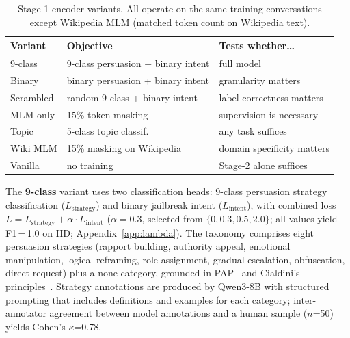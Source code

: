 \begin{table}[t]
\centering
\small
\caption{Stage-1 encoder variants. All operate on the same training conversations except Wikipedia MLM (matched token count on Wikipedia text).}
\label{tab:variants}
\begin{tabular}{@{}p{1.6cm}p{2.2cm}p{2.8cm}@{}}
\toprule
\textbf{Variant} & \textbf{Objective} & \textbf{Tests whether\ldots} \\
\midrule
9-class & 9-class persuasion + binary intent & full model \\
Binary & binary persuasion + binary intent & granularity matters \\
Scrambled & random 9-class + binary intent & label correctness matters \\
MLM-only & 15\% token masking & supervision is necessary \\
Topic & 5-class topic classif. & any task suffices \\
Wiki MLM & 15\% masking on Wikipedia & domain specificity matters \\
Vanilla & no training & Stage-2 alone suffices \\
\bottomrule
\end{tabular}
\end{table}

The \textbf{9-class} variant uses two classification heads: 9-class persuasion strategy classification ($L_{\text{strategy}}$) and binary jailbreak intent ($L_{\text{intent}}$), with combined loss $L = L_{\text{strategy}} + \alpha \cdot L_{\text{intent}}$ ($\alpha = 0.3$, selected from $\{0, 0.3, 0.5, 2.0\}$; all values yield F1\,=\,1.0 on IID; Appendix~\ref{app:lambda}). The taxonomy comprises eight persuasion strategies (rapport building, authority appeal, emotional manipulation, logical reframing, role assignment, gradual escalation, obfuscation, direct request) plus a none category, grounded in PAP~\citep{zeng2024pap} and Cialdini's principles~\citep{cialdini2001influence}. Strategy annotations are produced by Qwen3-8B with structured prompting that includes definitions and examples for each category; inter-annotator agreement between model annotations and a human sample ($n$=50) yields Cohen's $\kappa$=0.78.

